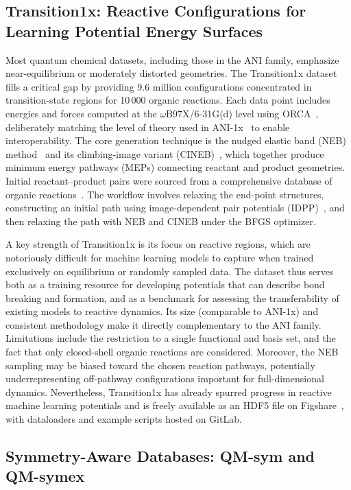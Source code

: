 \documentclass[12pt]{article}
\begin{document}
\subsection{Transition1x: Reactive Configurations for Learning Potential Energy Surfaces}\label{sec:transition1x}

Most quantum chemical datasets, including those in the ANI family, emphasize near-equilibrium or moderately distorted geometries. The Transition1x dataset~\cite{ds28-47} fills a critical gap by providing 9.6 million configurations concentrated in transition-state regions for 10\,000 organic reactions. Each data point includes energies and forces computed at the \(\omega\)B97X/6-31G(d) level using ORCA~\cite{ds28-143}, deliberately matching the level of theory used in ANI-1x~\cite{ds28-140} to enable interoperability. The core generation technique is the nudged elastic band (NEB) method~\cite{ds28-146} and its climbing-image variant (CINEB)~\cite{ds28-149}, which together produce minimum energy pathways (MEPs) connecting reactant and product geometries. Initial reactant–product pairs were sourced from a comprehensive database of organic reactions~\cite{ds28-147}. The workflow involves relaxing the end-point structures, constructing an initial path using image-dependent pair potentials (IDPP)~\cite{ds28-150}, and then relaxing the path with NEB and CINEB under the BFGS optimizer.

A key strength of Transition1x is its focus on reactive regions, which are notoriously difficult for machine learning models to capture when trained exclusively on equilibrium or randomly sampled data. The dataset thus serves both as a training resource for developing potentials that can describe bond breaking and formation, and as a benchmark for assessing the transferability of existing models to reactive dynamics. Its size (comparable to ANI-1x) and consistent methodology make it directly complementary to the ANI family. Limitations include the restriction to a single functional and basis set, and the fact that only closed-shell organic reactions are considered. Moreover, the NEB sampling may be biased toward the chosen reaction pathways, potentially underrepresenting off-pathway configurations important for full-dimensional dynamics. Nevertheless, Transition1x has already spurred progress in reactive machine learning potentials and is freely available as an HDF5 file on Figshare~\cite{ds28-151}, with dataloaders and example scripts hosted on GitLab.

\subsection{Symmetry-Aware Databases: QM-sym and QM-symex}\label{sec:qm-sym}
\end{document}
